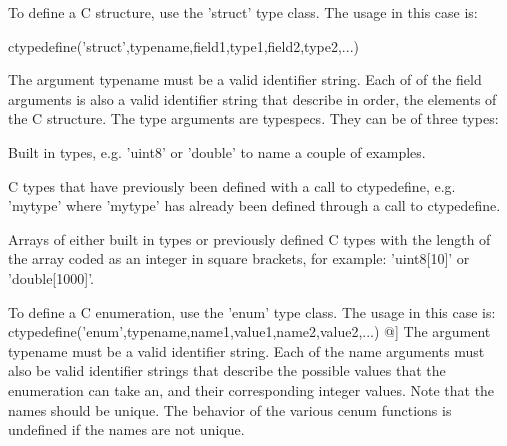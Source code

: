 To define a C structure, use the {\ttfamily 'struct'} type class. The usage in this case is\-: \begin{DoxyVerb}  ctypedefine('struct',typename,field1,type1,field2,type2,...)
\end{DoxyVerb}
 The argument {\ttfamily typename} must be a valid identifier string. Each of of the {\ttfamily field} arguments is also a valid identifier string that describe in order, the elements of the C structure. The {\ttfamily type} arguments are {\ttfamily typespecs}. They can be of three types\-: 
\begin{DoxyItemize}
\item Built in types, e.\-g. {\ttfamily 'uint8'} or {\ttfamily 'double'} to name a couple of examples.  
\item C types that have previously been defined with a call to {\ttfamily ctypedefine}, e.\-g. {\ttfamily 'mytype'} where {\ttfamily 'mytype'} has already been defined through a call to {\ttfamily ctypedefine}.  
\item Arrays of either built in types or previously defined C types with the length of the array coded as an integer in square brackets, for example\-: {\ttfamily 'uint8\mbox{[}10\mbox{]}'} or {\ttfamily 'double\mbox{[}1000\mbox{]}'}.  
\end{DoxyItemize}

To define a C enumeration, use the {\ttfamily 'enum'} type class. The usage in this case is\-: ctypedefine('enum',typename,name1,value1,name2,value2,...) @\mbox{]} The argument {\ttfamily typename} must be a valid identifier string. Each of the {\ttfamily name} arguments must also be valid identifier strings that describe the possible values that the enumeration can take an, and their corresponding integer values. Note that the names should be unique. The behavior of the various {\ttfamily cenum} functions is undefined if the names are not unique.

